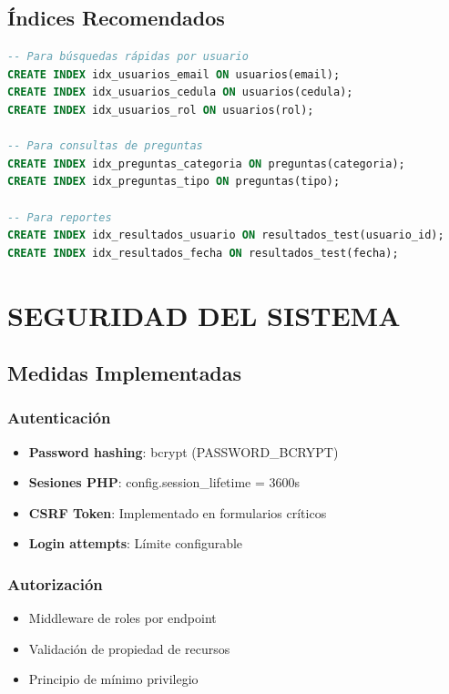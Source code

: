 \documentclass[12pt, a4paper]{report}
\begin{document}
\section{Índices Recomendados}
\begin{lstlisting}[language=SQL]
-- Para búsquedas rápidas por usuario
CREATE INDEX idx_usuarios_email ON usuarios(email);
CREATE INDEX idx_usuarios_cedula ON usuarios(cedula);
CREATE INDEX idx_usuarios_rol ON usuarios(rol);

-- Para consultas de preguntas
CREATE INDEX idx_preguntas_categoria ON preguntas(categoria);
CREATE INDEX idx_preguntas_tipo ON preguntas(tipo);

-- Para reportes
CREATE INDEX idx_resultados_usuario ON resultados_test(usuario_id);
CREATE INDEX idx_resultados_fecha ON resultados_test(fecha);
\end{lstlisting}

\chapter{SEGURIDAD DEL SISTEMA}

\section{Medidas Implementadas}

\subsection{Autenticación}
\begin{itemize}
    \item \textbf{Password hashing}: bcrypt (PASSWORD\_BCRYPT)
    \item \textbf{Sesiones PHP}: config.session\_lifetime = 3600s
    \item \textbf{CSRF Token}: Implementado en formularios críticos
    \item \textbf{Login attempts}: Límite configurable
\end{itemize}

\subsection{Autorización}
\begin{itemize}
    \item Middleware de roles por endpoint
    \item Validación de propiedad de recursos
    \item Principio de mínimo privilegio
\end{itemize}
\end{document}
